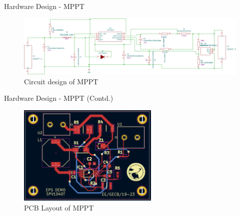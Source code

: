 \documentclass[aspectratio=169]{beamer}
\begin{document}
		
		
		
		\begin{frame}{Hardware Design - MPPT }
			\begin{figure}[h]
				\centering
				\includegraphics[width=1\textwidth]{diag/MpptDemoBoard.pdf}
				\caption{Circuit design of MPPT}
				\label{fig:mesh1}
			\end{figure}
		\end{frame}
		
		\begin{frame}{Hardware Design - MPPT (Contd.) }
			\begin{figure}[h]
				\centering
				\includegraphics[width=0.6\textwidth]{diag/MpptDemopcb.png}
				\caption{PCB Layout of MPPT}
				\label{fig:mesh1}
			\end{figure}
		\end{frame}
\end{document}

